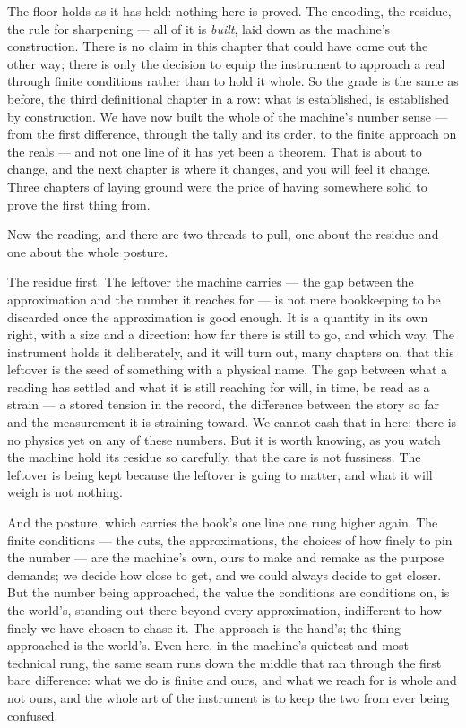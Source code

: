 The floor holds as it has held: nothing here is proved. The encoding, the residue, the rule for sharpening ---
all of it is \emph{built}, laid down as the machine's construction. There is no claim in this chapter that could
have come out the other way; there is only the decision to equip the instrument to approach a real through finite
conditions rather than to hold it whole. So the grade is the same as before, the third definitional chapter in a
row: what is established, is established by construction. We have now built the whole of the machine's number
sense --- from the first difference, through the tally and its order, to the finite approach on the reals --- and
not one line of it has yet been a theorem. That is about to change, and the next chapter is where it changes, and
you will feel it change. Three chapters of laying ground were the price of having somewhere solid to prove the
first thing from.

Now the reading, and there are two threads to pull, one about the residue and one about the whole posture.

The residue first. The leftover the machine carries --- the gap between the approximation and the number it
reaches for --- is not mere bookkeeping to be discarded once the approximation is good enough. It is a quantity
in its own right, with a size and a direction: how far there is still to go, and which way. The instrument holds
it deliberately, and it will turn out, many chapters on, that this leftover is the seed of something with a
physical name. The gap between what a reading has settled and what it is still reaching for will, in time, be
read as a strain --- a stored tension in the record, the difference between the story so far and the measurement
it is straining toward. We cannot cash that in here; there is no physics yet on any of these numbers. But it is
worth knowing, as you watch the machine hold its residue so carefully, that the care is not fussiness. The
leftover is being kept because the leftover is going to matter, and what it will weigh is not nothing.

And the posture, which carries the book's one line one rung higher again. The finite conditions --- the cuts, the
approximations, the choices of how finely to pin the number --- are the machine's own, ours to make and remake as
the purpose demands; we decide how close to get, and we could always decide to get closer. But the number being
approached, the value the conditions are conditions on, is the world's, standing out there beyond every
approximation, indifferent to how finely we have chosen to chase it. The approach is the hand's; the thing
approached is the world's. Even here, in the machine's quietest and most technical rung, the same seam runs down
the middle that ran through the first bare difference: what we do is finite and ours, and what we reach for is
whole and not ours, and the whole art of the instrument is to keep the two from ever being confused.
